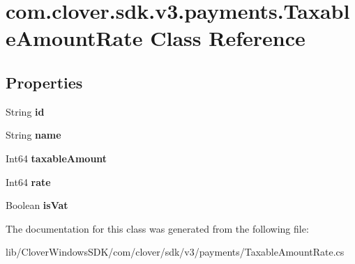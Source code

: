 \hypertarget{classcom_1_1clover_1_1sdk_1_1v3_1_1payments_1_1_taxable_amount_rate}{}\section{com.\+clover.\+sdk.\+v3.\+payments.\+Taxable\+Amount\+Rate Class Reference}
\label{classcom_1_1clover_1_1sdk_1_1v3_1_1payments_1_1_taxable_amount_rate}
\subsection*{Properties}
\begin{DoxyCompactItemize}
\item 
\mbox{\label{classcom_1_1clover_1_1sdk_1_1v3_1_1payments_1_1_taxable_amount_rate_a76b817580e3c7a9a073948637383423a}} 
String {\bfseries id}
\item 
\mbox{\label{classcom_1_1clover_1_1sdk_1_1v3_1_1payments_1_1_taxable_amount_rate_aec6c4dd635c912362efac5542acfdc54}} 
String {\bfseries name}
\item 
\mbox{\label{classcom_1_1clover_1_1sdk_1_1v3_1_1payments_1_1_taxable_amount_rate_a45ab1aca938e58b5f1f9e7ea46c8dcb7}} 
Int64 {\bfseries taxable\+Amount}
\item 
\mbox{\label{classcom_1_1clover_1_1sdk_1_1v3_1_1payments_1_1_taxable_amount_rate_af6f06f8ca87233452782565070c448f1}} 
Int64 {\bfseries rate}
\item 
\mbox{\label{classcom_1_1clover_1_1sdk_1_1v3_1_1payments_1_1_taxable_amount_rate_aee35743015a198379fbf1465cfa74b2e}} 
Boolean {\bfseries is\+Vat}
\end{DoxyCompactItemize}


The documentation for this class was generated from the following file\+:\begin{DoxyCompactItemize}
\item 
lib/\+Clover\+Windows\+S\+D\+K/com/clover/sdk/v3/payments/Taxable\+Amount\+Rate.\+cs\end{DoxyCompactItemize}
